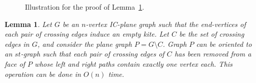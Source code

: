\documentclass[a4paper]{article}
\newtheorem{lemma}{Lemma}
\begin{document}
\begin{figure}[t]
\centering
{}\hfil
{}\hfil
{}\hfil
{}
\caption{\small Illustration for the proof of Lemma~\ref{le:st-orientation}.}
\end{figure}

\begin{lemma}\label{le:st-orientation}
Let $G$ be an $n$-vertex IC-plane graph such that the end-vertices of each pair of crossing edges induce an empty kite. Let $C$ be the set of crossing edges in $G$, and consider the plane graph $P = G\setminus C$. Graph $P$ can be oriented to an $st$-graph such that each pair of crossing edges of $C$ has been removed from a face of $P$ whose left and right paths contain exactly one vertex each. This operation can be done in $O(n)$ time.
\end{lemma}
\end{document}
